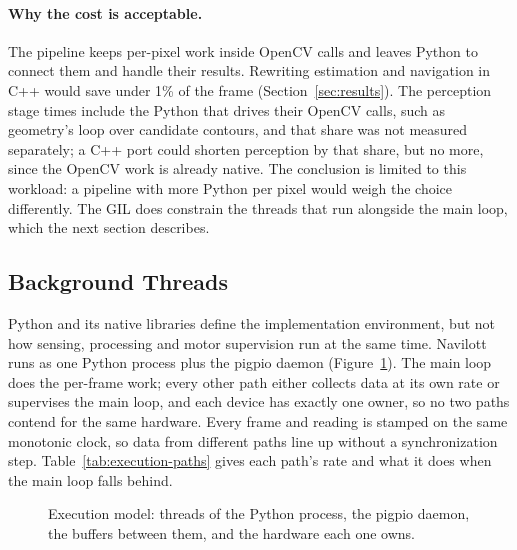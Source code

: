 \paragraph{Why the cost is acceptable.}
The pipeline keeps per-pixel work inside OpenCV calls and leaves Python to
connect them and handle their results. Rewriting estimation and navigation in
C++ would save under 1\% of the frame (Section~\ref{sec:results}). The
perception stage times include the Python that drives their OpenCV calls, such
as geometry's loop over candidate contours, and that share was not measured
separately; a C++ port could shorten perception by that share, but no more,
since the OpenCV work is already native. The conclusion is limited to this
workload: a pipeline with more Python per pixel would weigh the choice
differently. The GIL does constrain the threads that run alongside the main
loop, which the next section describes.

\subsection{Background Threads}\label{sec:background_threads}
Python and its native libraries define the implementation environment, but not
how sensing, processing and motor supervision run at the same time. Navilott
runs as one Python process plus the pigpio daemon
(Figure~\ref{fig:execution-model}). The main loop does the per-frame work;
every other path either collects data at its own rate or supervises the main
loop, and each device has exactly one owner, so no two paths contend for the
same hardware. Every frame and reading is stamped on the same monotonic clock,
so data from different paths line up without a synchronization step.
Table~\ref{tab:execution-paths} gives each path's rate and what it does when
the main loop falls behind.

\begin{figure}[H]
      \centering
      
      \caption{Execution model: threads of the Python process, the pigpio daemon,
            the buffers between them, and the hardware each one owns.}
      \label{fig:execution-model}
\end{figure}

